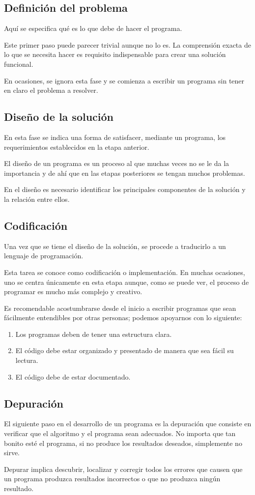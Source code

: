\subsection{Definición del problema}
Aquí se especifica qué es lo que debe de hacer el programa.
\par
Este primer paso puede parecer trivial aunque no lo es. La comprensión exacta de lo que se necesita hacer es requisito indispensable para crear una solución funcional.
\par
En ocasiones, se ignora esta fase y se comienza a escribir un programa sin tener en claro el problema a resolver.
\subsection{Diseño de la solución}
En esta fase se indica una forma de satisfacer, mediante un programa, los requerimientos establecidos en la etapa anterior.
\par
El diseño de un programa es un proceso al que muchas veces no se le da la importancia y de ahí que en las etapas posteriores se tengan muchos problemas.
\par
En el diseño es necesario identificar los principales componentes de la solución y la relación entre ellos.
\subsection{Codificación}
Una vez que se tiene el diseño de la solución, se procede a traducirlo a un lenguaje de programación.
\par
Esta tarea se conoce como codificación o implementación. En muchas ocasiones, uno se centra únicamente en esta etapa aunque, como se puede ver, el proceso de programar es mucho más complejo y creativo.
\par
Es recomendable acostumbrarse desde el inicio a escribir programas que sean fácilmente entendibles por otras personas; podemos apoyarnos con lo siguiente:
\begin{enumerate}
\item Los programas deben de tener una estructura clara.
\item El código debe estar organizado y presentado de manera que sea fácil su lectura.
\item El código debe de estar documentado.
\end{enumerate}
\subsection{Depuración}
El siguiente paso en el desarrollo de un programa es la depuración que consiste en verificar que el algoritmo y el programa sean adecuados. No importa que tan bonito esté el programa, si no produce los resultados deseados, simplemente no sirve.
\par
Depurar implica descubrir, localizar y corregir todos los errores que causen que un programa produzca resultados incorrectos o que no produzca ningún resultado.
